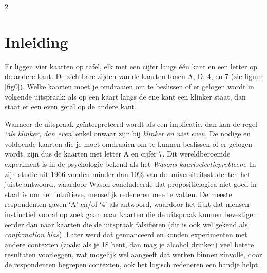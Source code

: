 \startcontents[mainsections]		      %
\begin{multicols}{2}                      
\inhoudstafelLoep		                  %




\section{Inleiding}

\begin{citaat} {Er liggen vier kaarten op tafel, elk met een cijfer langs één kant en een letter op de andere kant. De zichtbare zijden van de kaarten tonen A, D, 4, en 7 (zie figuur \ref{fig0}). Welke kaarten moet je omdraaien om te beslissen of er gelogen wordt in volgende uitspraak: als op een kaart langs de ene kant een klinker staat, dan staat er een even getal op de andere kant.} \end{citaat}

Wanneer de uitspraak geïnterpreteerd wordt als een implicatie, dan kan de regel \textit{`als klinker, dan even'} enkel onwaar zijn bij \textit{klinker en niet even}. De nodige en voldoende kaarten die je moet omdraaien om te kunnen beslissen of er gelogen wordt, zijn dus de kaarten met letter A en cijfer 7. Dit wereldberoemde experiment is in de psychologie bekend als het \textit{Wasons kaartselectieprobleem}. In zijn studie uit 1966 vonden minder dan 10\% van de universiteitsstudenten het juiste antwoord, waardoor Wason concludeerde dat propositielogica niet goed in staat is om het intuïtieve, menselijk redeneren mee te vatten. De meeste respondenten gaven `A' en/of `4' als antwoord, waardoor het lijkt dat mensen instinctief vooral op zoek gaan naar kaarten die de uitspraak kunnen bevestigen eerder dan naar kaarten die de uitspraak falsifiëren (dit is ook wel gekend als \textit{confirmation bias}).  Later werd dat genuanceerd en konden experimenten met andere contexten (zoals: als je 18 bent, dan mag je alcohol drinken) veel betere resultaten voorleggen, wat mogelijk wel aangeeft dat werken binnen zinvolle, door de respondenten begrepen contexten, ook het logisch redeneren een handje helpt.


\end{multicols}
